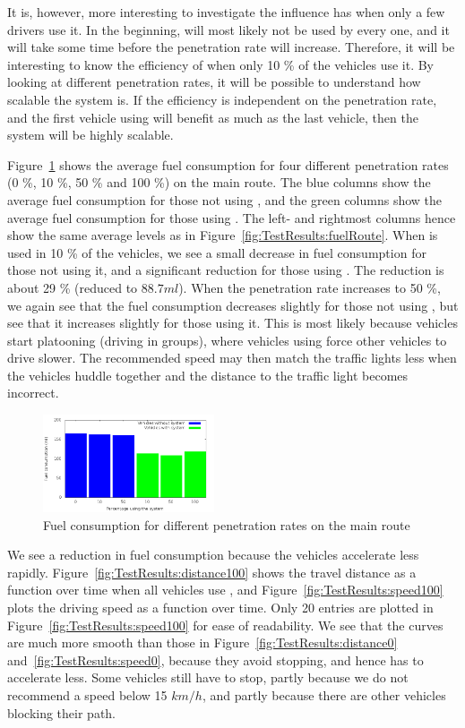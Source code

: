 It is, however, more interesting to investigate the influence \tech has when only a few drivers use it.
In the beginning, \tech will most likely not be used by every one, and it will take some time before the penetration rate will increase.
Therefore, it will be interesting to know the efficiency of \tech when only 10 \% of the vehicles use it. 
By looking at different penetration rates, it will be possible to understand how scalable the system is.
If the efficiency is independent on the penetration rate, and the first vehicle using \tech will benefit as much as the last vehicle, then the system will be highly scalable.

Figure~\ref{fig:TestResults:combinedFuel} shows the average fuel consumption for four different penetration rates (0 \%, 10 \%, 50 \% and 100 \%) on the main route.
The blue columns show the average fuel consumption for those not using \tech, and the green columns show the average fuel consumption for those using \tech.
The left- and rightmost columns hence show the same average levels as in Figure~\ref{fig:TestResults:fuelRoute}.
When \tech is used in 10 \% of the vehicles, we see a small decrease in fuel consumption for those not using it, and a significant reduction for those using \tech.
The reduction is about 29 \% (reduced to $88.7 ml$).
When the penetration rate increases to 50 \%, we again see that the fuel consumption decreases slightly for those not using \tech, but see that it increases slightly for those using it.
This is most likely because vehicles start platooning (driving in groups), where vehicles using \tech force other vehicles to drive slower.
The recommended speed may then match the traffic lights less when the vehicles huddle together and the distance to the traffic light becomes incorrect.

\begin{figure}[htb]
\includegraphics[width=0.45\textwidth]{../images/tp0c1_0/combinedFuel.png}
\caption{Fuel consumption for different penetration rates on the main route}
\label{fig:TestResults:combinedFuel}
\end{figure}

We see a reduction in fuel consumption because the vehicles accelerate less rapidly. 
Figure~\ref{fig:TestResults:distance100} shows the travel distance as a function over time when all vehicles use \tech, and Figure~\ref{fig:TestResults:speed100} plots the driving speed as a function over time. 
Only 20 entries are plotted in Figure~\ref{fig:TestResults:speed100} for ease of readability.
We see that the curves are much more smooth than those in Figure~\ref{fig:TestResults:distance0} and~\ref{fig:TestResults:speed0}, because they avoid stopping, and hence has to accelerate less.
Some vehicles still have to stop, partly because we do not recommend a speed below 15 $km/h$, and partly because there are other vehicles blocking their path.

